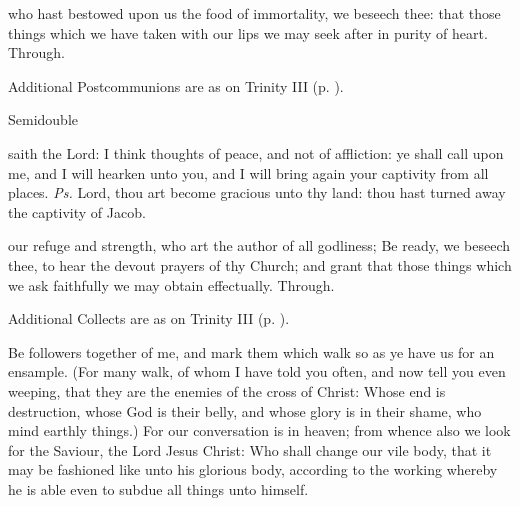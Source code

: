\postcommunion
{} who hast bestowed upon us the food of immortality, we beseech thee: that those things which we have taken with our lips we may seek after in purity of heart. Through.
\begin{rubric}
    Additional Postcommunions are as on Trinity III (p. \pageref{TrinityIII}).
\end{rubric}

\begin{inhead}
{Semidouble}
\end{inhead}
\par\noindent
{}


\introit
{} saith the Lord: I think thoughts of peace, and not of affliction: ye shall call upon me, and I will hearken unto you, and I will bring again your captivity from all places. \textit{Ps.} Lord, thou art become gracious unto thy land: thou hast turned away the captivity of Jacob.

\collect
{} our refuge and strength, who art the author of all godliness; Be ready, we beseech thee, to hear the devout prayers of thy Church; and grant that those things which we ask faithfully we may obtain effectually. Through.
\begin{rubric}
    Additional Collects are as on Trinity III (p. \pageref{TrinityIII}).
\end{rubric}

 Be followers together of me, and mark them which walk so as ye have us for an ensample. (For many walk, of whom I have told you often, and now tell you even weeping, that they are the enemies of the cross of Christ: Whose end is destruction, whose God is their belly, and whose glory is in their shame, who mind earthly things.) For our conversation is in heaven; from whence also we look for the Saviour, the Lord Jesus Christ: Who shall change our vile body, that it may be fashioned like unto his glorious body, according to the working whereby he is able even to subdue all things unto himself.


